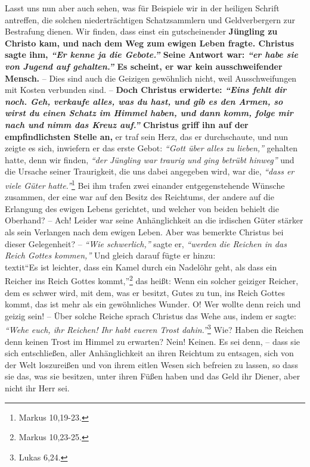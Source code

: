 Lasst uns nun aber auch sehen, was für Beispiele wir in der heiligen Schrift
antreffen, die solchen niederträchtigen
Schatzsammlern und Geldverbergern zur
Bestrafung dienen. Wir finden, dass einst ein gutscheinender
\textbf{Jüngling zu Christo
kam, und nach dem Weg zum ewigen Leben fragte. Christus sagte ihm,
\textit{"`Er kenne ja die Gebote."'} Seine Antwort war:
\textit{"`er habe sie von Jugend auf gehalten."'} Es
scheint, er war kein ausschweifender Mensch.} -- Dies sind auch die Geizigen
gewöhnlich nicht, weil Ausschweifungen mit Kosten verbunden
sind. -- \textbf{Doch
Christus erwiderte:
\textit{"`Eins fehlt dir noch. Geh, verkaufe alles, was du hast,
und gib es den Armen, so wirst du einen Schatz im Himmel haben, und dann komm, folge mir nach
und nimm das Kreuz auf."'} Christus griff ihn auf der
empfindlichsten Stelle an,} er traf sein Herz, das er durchschaute, und nun
zeigte es sich, inwiefern er das erste Gebot: \textit{"`Gott über alles zu
lieben,"'}
gehalten hatte, denn wir finden, \textit{"`der Jüngling war traurig und ging
betrübt
hinweg"'} und die Ursache seiner Traurigkeit, die uns dabei angegeben wird, war
die,
\textit{"`dass er viele Güter hatte."'}\footnote{Markus 10,19-23.}
Bei ihm trafen zwei einander entgegenstehende Wünsche zusammen, der eine war auf den Besitz des
Reichtums, der andere auf die Erlangung des ewigen Lebens
gerichtet, und
welcher von beiden behielt die Oberhand? -- Ach! Leider war seine Anhänglichkeit
an die irdischen Güter stärker als sein Verlangen nach dem ewigen Leben. Aber
was bemerkte Christus bei dieser Gelegenheit? -- \textit{"`Wie schwerlich,"'}
sagte er,
\textit{"`werden die Reichen in das Reich Gottes kommen,"'} Und gleich darauf
fügte er
hinzu:\\textit{"`Es ist leichter, dass ein Kamel durch ein Nadelöhr geht, als
dass ein
Reicher ins Reich Gottes kommt,"'}\footnote{Markus 10,23-25.}
das heißt: Wenn ein
solcher geiziger Reicher, dem es schwer wird, mit dem, was er besitzt, Gutes zu
tun, ins Reich Gottes kommt, das ist mehr als ein
gewöhnliches Wunder. O! Wer
wollte denn reich und geizig sein! -- Über solche Reiche sprach Christus das
Wehe aus, indem er sagte: \textit{"`Wehe euch, ihr Reichen! Ihr habt eueren
Trost
dahin."'}\footnote{Lukas 6,24.}
Wie? Haben die Reichen denn keinen Trost im
Himmel zu erwarten? Nein! Keinen. Es sei denn, -- dass sie sich
entschließen,
aller Anhänglichkeit an ihren Reichtum zu entsagen, sich von der Welt
loszureißen und von ihrem eitlen Wesen sich befreien zu lassen, so dass sie das,
was sie besitzen, unter ihren Füßen haben und das Geld ihr Diener, aber nicht
ihr Herr sei.

